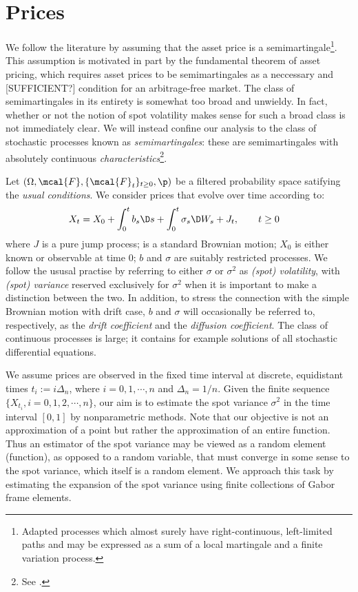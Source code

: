 
\section{Prices} \label{sec:model}
We follow the literature by assuming that the asset price is a semimartingale\footnote{Adapted processes which almost surely have  right-continuous, left-limited paths and  may be expressed as a sum of a local martingale and a finite variation process.}. This assumption is motivated in part by the fundamental theorem of asset pricing, which requires asset prices to be semimartingales as a neccessary  and [SUFFICIENT?] condition for an arbitrage-free market. The class of semimartingales in its entirety  is somewhat too broad and  unwieldy. In fact, whether or not the notion of spot volatility makes sense for such a broad class is not immediately clear. We will instead confine our analysis to the class of stochastic processes known as  \emph{\ito  semimartingales}: these are semimartingales with absolutely continuous \emph{characteristics}\footnote{See \cite{Jacod2003}.}. 


Let $(\Omega, \mcal{F}, \{\mcal{F}_t\}_{t \ge 0}, \p)$ be a filtered probability space satifying the \emph{usual conditions}. We consider prices that evolve over time according to:
\begin{align}
  X_t & = X_0 + \int_0^t b_s \D s + \int_0^t \sigma_s \D W_s   + J_t, \qquad t \ge 0  
  \label{eq:semimartingale}
\end{align}
where $J$ is a pure jump process; \sbm is a standard Brownian motion;  $X_0$ is either known or observable at time 0;   $b$ and $\sigma$ are suitably restricted processes. We follow the ususal practise by referring to either $\sigma$ or $\sigma^2$  as \emph{(spot) volatility}, with \emph{(spot) variance} reserved exclusively for $\sigma^2$ when it is important to make a  distinction between the two. In addition, to stress the connection with the simple Brownian motion with drift case, $b$ and $\sigma$ will occasionally be referred to, respectively, as the \emph{drift coefficient} and the \emph{diffusion coefficient}. 
 The class of continuous \ito processes is large; it contains for example   solutions of all stochastic differential equations.

 We assume prices are observed in the fixed time interval \domain at discrete, equidistant times $t_i := i\Delta_n$, where  $i= 0,1,\cdots,n$ and $\Delta_n = 1/n$. Given the finite sequence  $\{X_{t_i}, i=0,1,2,\cdots,n\}$, our aim is to estimate the spot variance $\sigma^2$ in the time interval $[0,1]$ by nonparametric methods. Note that our objective is not an approximation of a point but rather the approximation of an entire function. Thus an estimator of the spot variance may be viewed as a  random element (function), as opposed to a random variable, that must converge in some sense to the spot variance, which itself is a random element. We approach this task  by estimating the expansion of the spot variance using  finite collections of  Gabor frame elements.
